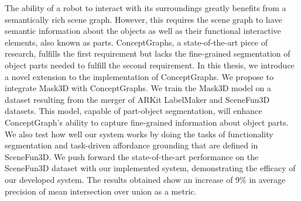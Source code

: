 The ability of a robot to interact with its surroundings greatly benefits from a semantically rich scene graph. However, this requires the scene graph to have semantic information about the objects as well as their functional interactive elements, also known as parts. ConceptGraphs, a state-of-the-art piece of research, fulfills the first requirement but lacks the fine-grained segmentation of object parts needed to fulfill the second requirement. In this thesis, we introduce a novel extension to the implementation of ConceptGraphs. We propose to integrate Mask3D with ConceptGraphs. We train the Mask3D model on a dataset resulting from the merger of ARKit LabelMaker and SceneFun3D datasets. This model, capable of part-object segmentation, will enhance ConceptGraph's ability to capture fine-grained information about object parts. We also test how well our system works by doing the tasks of functionality segmentation and task-driven affordance grounding that are defined in SceneFun3D. We push forward the state-of-the-art performance on the SceneFun3D dataset with our implemented system, demonstrating the efficacy of our developed system. The results obtained show an increase of 9\% in average precision of mean intersection over union as a metric.